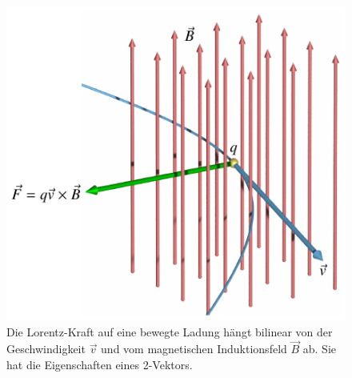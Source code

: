 %
%
%
\begin{figure}
\centering
\includegraphics{chapters/040-green/images/lorentz.pdf}
\caption{Die Lorentz-Kraft auf eine bewegte Ladung hängt bilinear
von der Geschwindigkeit $\vec{v}$ und vom magnetischen Induktionsfeld
$\vec{B}$ ab.
Sie hat die Eigenschaften eines 2-Vektors.
\label{buch:green:2vektoren:fig:lorentz}}
\end{figure}

